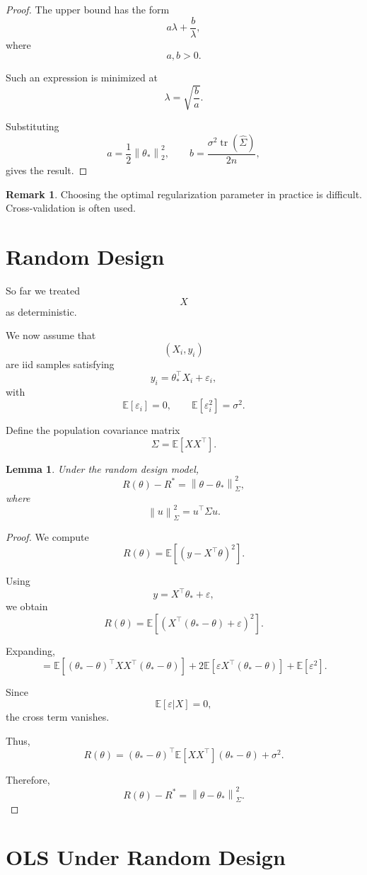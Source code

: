\documentclass[12pt,oneside]{book}
\numberwithin{equation}{section}
\theoremstyle{definition}
\newtheorem{remark}{Remark}[section]
\theoremstyle{plain}
\newtheorem{lemma}{Lemma}[section]
\theoremstyle{remark}
\newcommand{\E}{\mathbb{E}}
\newcommand{\norm}[1]{\left\lVert #1 \right\rVert}
\newcommand{\tr}{\operatorname{tr}}
\begin{document}
\begin{proof}
The upper bound has the form
\[
a\lambda+\frac{b}{\lambda},
\]
where
\[
a,b>0.
\]

Such an expression is minimized at
\[
\lambda=\sqrt{\frac{b}{a}}.
\]

Substituting
\[
a=\frac{1}{2}\norm{\theta_*}_2^2,
\qquad
b=\frac{\sigma^2\tr(\widehat{\Sigma})}{2n},
\]
gives the result.
\end{proof}

\begin{remark}
Choosing the optimal regularization parameter in practice is difficult. Cross-validation is often used.
\end{remark}

\section{Random Design}

So far we treated
\[
X
\]
as deterministic.

We now assume that
\[
(X_i,y_i)
\]
are iid samples satisfying
\[
y_i=\theta_*^\top X_i+\varepsilon_i,
\]
with
\[
\E[\varepsilon_i]=0,
\qquad
\E[\varepsilon_i^2]=\sigma^2.
\]

Define the population covariance matrix
\[
\Sigma
=
\E[XX^\top].
\]

\begin{lemma}
Under the random design model,
\[
R(\theta)-R^*
=
\norm{\theta-\theta_*}_{\Sigma}^2,
\]
where
\[
\norm{u}_{\Sigma}^2
=
u^\top\Sigma u.
\]
\end{lemma}

\begin{proof}
We compute
\[
R(\theta)
=
\E[(y-X^\top\theta)^2].
\]

Using
\[
y=X^\top\theta_*+\varepsilon,
\]
we obtain
\[
R(\theta)
=
\E[(X^\top(\theta_*-\theta)+\varepsilon)^2].
\]

Expanding,
\[
=
\E[(\theta_*-\theta)^\top XX^\top(\theta_*-\theta)]
+
2\E[\varepsilon X^\top(\theta_*-\theta)]
+
\E[\varepsilon^2].
\]

Since
\[
\E[\varepsilon|X]=0,
\]
the cross term vanishes.

Thus,
\[
R(\theta)
=
(\theta_*-\theta)^\top
\E[XX^\top]
(\theta_*-\theta)
+
\sigma^2.
\]

Therefore,
\[
R(\theta)-R^*
=
\norm{\theta-\theta_*}_{\Sigma}^2.
\]
\end{proof}

\section{OLS Under Random Design}
\end{document}
